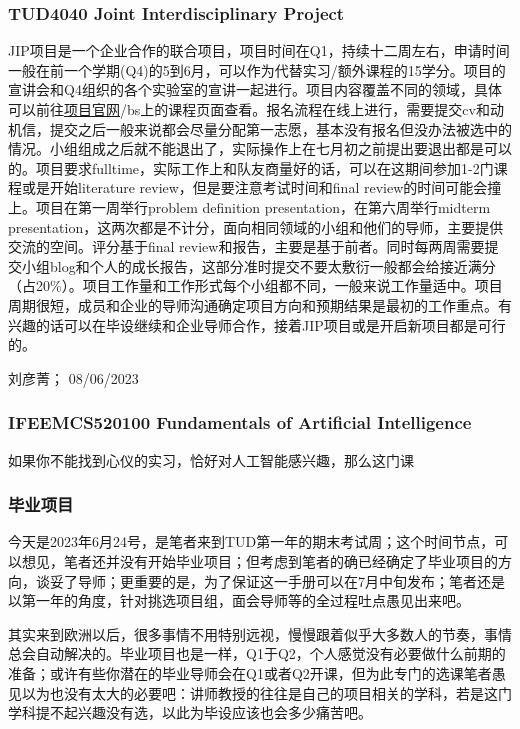 \subsubsection{TUD4040 Joint Interdisciplinary Project}
JIP项目是一个企业合作的联合项目，项目时间在Q1，持续十二周左右，申请时间一般在前一个学期(Q4)的5到6月，可以作为代替实习/额外课程的15学分。项目的宣讲会和Q4组织的各个实验室的宣讲一起进行。项目内容覆盖不同的领域，具体可以前往\href{https://www.jointinterdisciplinaryproject.nl/}{\uline{项目官网}}/bs上的课程页面查看。报名流程在线上进行，需要提交cv和动机信，提交之后一般来说都会尽量分配第一志愿，基本没有报名但没办法被选中的情况。小组组成之后就不能退出了，实际操作上在七月初之前提出要退出都是可以的。项目要求fulltime，实际工作上和队友商量好的话，可以在这期间参加1-2门课程或是开始literature review，但是要注意考试时间和final review的时间可能会撞上。项目在第一周举行problem definition presentation，在第六周举行midterm presentation，这两次都是不计分，面向相同领域的小组和他们的导师，主要提供交流的空间。评分基于final review和报告，主要是基于前者。同时每两周需要提交小组blog和个人的成长报告，这部分准时提交不要太敷衍一般都会给接近满分（占20\%）。项目工作量和工作形式每个小组都不同，一般来说工作量适中。项目周期很短，成员和企业的导师沟通确定项目方向和预期结果是最初的工作重点。有兴趣的话可以在毕设继续和企业导师合作，接着JIP项目或是开启新项目都是可行的。

\begin{flushright}
刘彦菁； 08/06/2023
\end{flushright}
\subsubsection{IFEEMCS520100 Fundamentals of Artificial Intelligence}
如果你不能找到心仪的实习，恰好对人工智能感兴趣，那么这门课

\subsubsection{毕业项目}

今天是2023年6月24号，是笔者来到TUD第一年的期末考试周；这个时间节点，可以想见，笔者还并没有开始毕业项目；但考虑到笔者的确已经确定了毕业项目的方向，谈妥了导师；更重要的是，为了保证这一手册可以在7月中旬发布；笔者还是以第一年的角度，针对挑选项目组，面会导师等的全过程吐点愚见出来吧。

其实来到欧洲以后，很多事情不用特别远视，慢慢跟着似乎大多数人的节奏，事情总会自动解决的。毕业项目也是一样，Q1于Q2，个人感觉没有必要做什么前期的准备；或许有些你潜在的毕业导师会在Q1或者Q2开课，但为此专门的选课笔者愚见以为也没有太大的必要吧：讲师教授的往往是自己的项目相关的学科，若是这门学科提不起兴趣没有选，以此为毕设应该也会多少痛苦吧。

